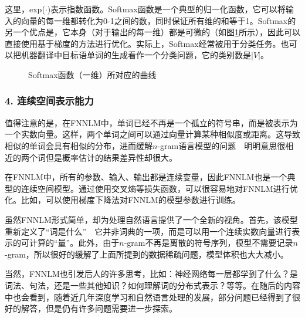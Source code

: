 \noindent 这里，exp($\cdot$)表示指数函数。Softmax函数是一个典型的归一化函数，它可以将输入的向量的每一维都转化为0-1之间的数，同时保证所有维的和等于1。Softmax的另一个优点是，它本身（对于输出的每一维）都是可微的（如图\ref{fig:softmax}所示），因此可以直接使用基于梯度的方法进行优化。实际上，Softmax经常被用于分类任务。也可以把机器翻译中目标语单词的生成看作一个分类问题，它的类别数是|$V$|。

\begin{figure}[htp]
\centering

\caption{ Softmax函数（一维）所对应的曲线}
\label{fig:softmax}
\end{figure}


\subsubsection{4. 连续空间表示能力}

\parinterval  值得注意的是，在FNNLM中，单词已经不再是一个孤立的符号串，而是被表示为一个实数向量。这样，两个单词之间可以通过向量计算某种相似度或距离。这导致相似的单词会具有相似的分布，进而缓解$n$-gram语言模型的问题\ \dash \ 明明意思很相近的两个词但是概率估计的结果差异性却很大。

\parinterval  在FNNLM中，所有的参数、输入、输出都是连续变量，因此FNNLM也是一个典型的连续空间模型。通过使用交叉熵等损失函数，可以很容易地对FNNLM进行优化。比如，可以使用梯度下降法对FNNLM的模型参数进行训练。

\parinterval  虽然FNNLM形式简单，却为处理自然语言提供了一个全新的视角。首先，该模型重新定义了“词是什么”\ \dash \ 它并非词典的一项，而是可以用一个连续实数向量进行表示的可计算的“量”。此外，由于$n$-gram不再是离散的符号序列，模型不需要记录$n$-gram，所以很好的缓解了上面所提到的数据稀疏问题，模型体积也大大减小。

\parinterval  当然，FNNLM也引发后人的许多思考，比如：神经网络每一层都学到了什么？是词法、句法，还是一些其他知识？如何理解词的分布式表示？等等。在随后的内容中也会看到，随着近几年深度学习和自然语言处理的发展，部分问题已经得到了很好的解答，但是仍有许多问题需要进一步探索。


